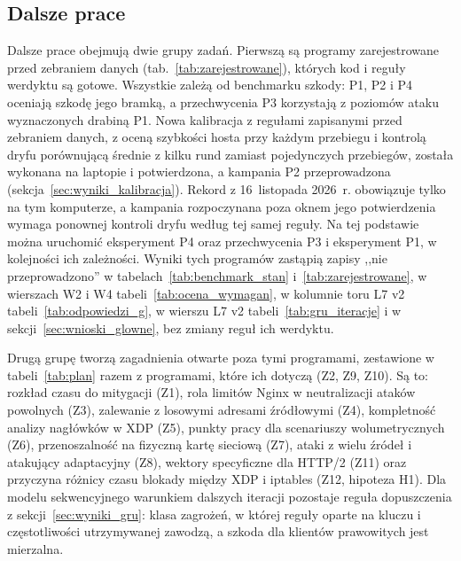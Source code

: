 \documentclass[a4paper,12pt]{article}
\begin{document}
\subsection{Dalsze prace}\label{sec:plan}
Dalsze prace obejmują dwie grupy zadań. Pierwszą są programy zarejestrowane przed zebraniem danych (tab.~\ref{tab:zarejestrowane}), których kod i reguły werdyktu są gotowe. Wszystkie zależą od benchmarku szkody: P1, P2 i P4 oceniają szkodę jego bramką, a przechwycenia P3 korzystają z poziomów ataku wyznaczonych drabiną P1. Nowa kalibracja z regułami zapisanymi przed zebraniem danych, z oceną szybkości hosta przy każdym przebiegu i kontrolą dryfu porównującą średnie z kilku rund zamiast pojedynczych przebiegów, została wykonana na laptopie i potwierdzona, a kampania P2 przeprowadzona (sekcja~\ref{sec:wyniki_kalibracja}). Rekord z 16~listopada 2026~r. obowiązuje tylko na tym komputerze, a kampania rozpoczynana poza oknem jego potwierdzenia wymaga ponownej kontroli dryfu według tej samej reguły. Na tej podstawie można uruchomić eksperyment P4 oraz przechwycenia P3 i eksperyment P1, w kolejności ich zależności. Wyniki tych programów zastąpią zapisy ,,nie przeprowadzono'' w tabelach~\ref{tab:benchmark_stan} i~\ref{tab:zarejestrowane}, w wierszach W2 i W4 tabeli~\ref{tab:ocena_wymagan}, w kolumnie toru L7 v2 tabeli~\ref{tab:odpowiedzi_g}, w wierszu L7 v2 tabeli~\ref{tab:gru_iteracje} i w sekcji~\ref{sec:wnioski_glowne}, bez zmiany reguł ich werdyktu.

Drugą grupę tworzą zagadnienia otwarte poza tymi programami, zestawione w tabeli~\ref{tab:plan} razem z programami, które ich dotyczą (Z2, Z9, Z10). Są to: rozkład czasu do mitygacji (Z1), rola limitów Nginx w neutralizacji ataków powolnych (Z3), zalewanie z losowymi adresami źródłowymi (Z4), kompletność analizy nagłówków w XDP (Z5), punkty pracy dla scenariuszy wolumetrycznych (Z6), przenoszalność na fizyczną kartę sieciową (Z7), ataki z wielu źródeł i atakujący adaptacyjny (Z8), wektory specyficzne dla HTTP/2 (Z11) oraz przyczyna różnicy czasu blokady między XDP i iptables (Z12, hipoteza H1). Dla modelu sekwencyjnego warunkiem dalszych iteracji pozostaje reguła dopuszczenia z sekcji~\ref{sec:wyniki_gru}: klasa zagrożeń, w której reguły oparte na kluczu i częstotliwości utrzymywanej zawodzą, a szkoda dla klientów prawowitych jest mierzalna.
\end{document}
